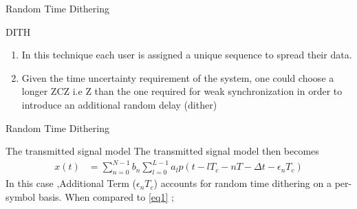 \documentclass{beamer}
\begin{document}
\begin{frame}{Random Time Dithering}
\begin{block}{DITH}
\begin{enumerate}
    \item In this technique each user is assigned a unique sequence to spread their data.
    \item Given the time uncertainty requirement of the
system, one could choose a longer ZCZ i.e Z than the one required for weak synchronization in order to introduce an additional random delay (dither)
\end{enumerate}
\end{block}

\end{frame}

\begin{frame}{Random Time Dithering}
\begin{block}{The transmitted signal model}
The transmitted signal model then becomes
\begin{align}
    x(t)& = \sum_{n = 0}^{N-1}b_{n}\sum_{l= 0}^{L-1}a_{l}p(t - lT_{c} -nT - \Delta t -\epsilon_{n} T_{c})
    \label{eq3}
\end{align}
   In this case ,Additional Term ($\epsilon_{n} T_{c}$)  accounts for random time dithering on a per-symbol basis. When compared to \eqref{eq1} ;
\end{block}
    
\end{frame}
\end{document}
